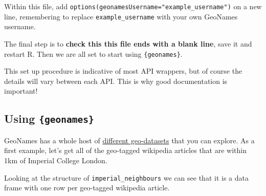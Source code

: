 \documentclass[
  12pt,
]{book}
\newenvironment{Shaded}{\begin{snugshade}}{\end{snugshade}}
\newcommand{\AttributeTok}[1]{\textcolor[rgb]{0.77,0.63,0.00}{#1}}
\newcommand{\CommentTok}[1]{\textcolor[rgb]{0.56,0.35,0.01}{\textit{#1}}}
\newcommand{\DecValTok}[1]{\textcolor[rgb]{0.00,0.00,0.81}{#1}}
\newcommand{\FloatTok}[1]{\textcolor[rgb]{0.00,0.00,0.81}{#1}}
\newcommand{\FunctionTok}[1]{\textcolor[rgb]{0.00,0.00,0.00}{#1}}
\newcommand{\NormalTok}[1]{#1}
\newcommand{\OtherTok}[1]{\textcolor[rgb]{0.56,0.35,0.01}{#1}}
\newcommand{\SpecialCharTok}[1]{\textcolor[rgb]{0.00,0.00,0.00}{#1}}
\newcommand{\StringTok}[1]{\textcolor[rgb]{0.31,0.60,0.02}{#1}}
\begin{document}
Within this file, add \texttt{options(geonamesUsername="example\_username")} on a new line, remembering to replace \texttt{example\_username} with your own GeoNames username.

The final step is to \textbf{check this this file ends with a blank line}, save it and restart R. Then we are all set to start using \texttt{\{geonames\}}.

This set up procedure is indicative of most API wrappers, but of course the details will vary between each API. This is why good documentation is important!

\hypertarget{using-geonames}{%
\subsection{\texorpdfstring{Using \texttt{\{geonames\}}}{Using \{geonames\}}}\label{using-geonames}}

GeoNames has a whole host of \href{http://www.geonames.org/export/ws-overview.html}{different geo-datasets} that you can explore.
As a first example, let's get all of the geo-tagged wikipedia articles that are within 1km of Imperial College London.

\begin{Shaded}
\end{Shaded}

Looking at the structure of \texttt{imperial\_neighbours} we can see that it is a data frame with one row per geo-tagged wikipedia article.
\end{document}
